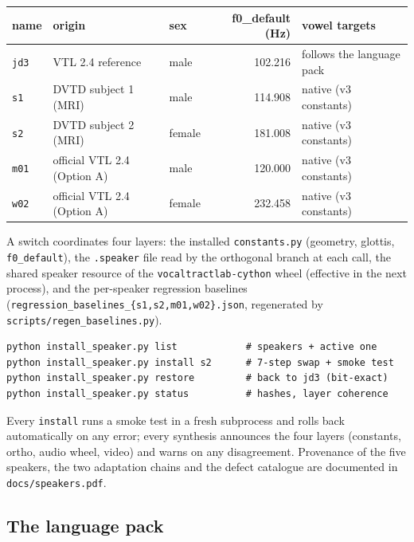 \documentclass[11pt,a4paper]{article}
\begin{document}
\begin{center}
\small
\begin{tabular}{@{}lllrl@{}}
\toprule
\textbf{name} & \textbf{origin} & \textbf{sex} &
\textbf{f0\_default (Hz)} & \textbf{vowel targets} \\
\midrule
\texttt{jd3} & VTL 2.4 reference & male & 102.216 & follows the language pack \\
\texttt{s1}  & DVTD subject 1 (MRI) & male & 114.908 & native (v3 constants) \\
\texttt{s2}  & DVTD subject 2 (MRI) & female & 181.008 & native (v3 constants) \\
\texttt{m01} & official VTL 2.4 (Option A) & male & 120.000 & native (v3 constants) \\
\texttt{w02} & official VTL 2.4 (Option A) & female & 232.458 & native (v3 constants) \\
\bottomrule
\end{tabular}
\end{center}

A switch coordinates four layers: the installed \texttt{constants.py}
(geometry, glottis, \texttt{f0\_default}), the \texttt{.speaker} file
read by the orthogonal branch at each call, the shared speaker
resource of the \texttt{vocaltractlab-cython} wheel (effective in the
next process), and the per-speaker regression baselines
(\texttt{regression\_baselines\_\{s1,s2,m01,w02\}.json}, regenerated by
\texttt{scripts/regen\_baselines.py}).

\begin{lstlisting}[style=shell]
python install_speaker.py list            # speakers + active one
python install_speaker.py install s2      # 7-step swap + smoke test
python install_speaker.py restore         # back to jd3 (bit-exact)
python install_speaker.py status          # hashes, layer coherence
\end{lstlisting}

Every \texttt{install} runs a smoke test in a fresh subprocess and
rolls back automatically on any error; every synthesis announces the
four layers (constants, ortho, audio wheel, video) and warns on any
disagreement. Provenance of the five speakers, the two adaptation
chains and the defect catalogue are documented in
\texttt{docs/speakers.pdf}.

\subsection{The language pack}
\end{document}
